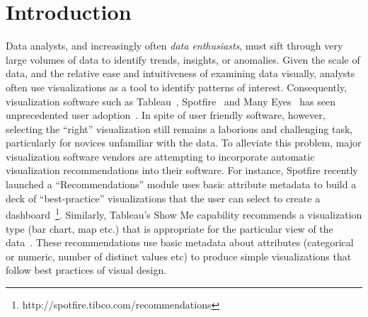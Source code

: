 
\section{Introduction}
\label{sec:introduction}


Data analysts, and increasingly often {\it data enthusiasts}, must sift through very large volumes of data 
to identify trends, insights, or anomalies. 
Given the scale of data, and the relative ease and intuitiveness of examining data visually,
analysts often use visualizations as a tool to identify patterns of interest.
Consequently, visualization software such as Tableau~\cite{}, Spotfire~\cite{} and Many Eyes~\cite{} 
has seen unprecedented user adoption~\cite{kristi-tech-report}.
In spite of user friendly software, however, selecting the ``right'' visualization still remains a laborious and 
challenging task, particularly for novices unfamiliar with the data. 
To alleviate this problem, major visualization software vendors are attempting to incorporate automatic visualization
recommendations into their software.
For instance, Spotfire recently launched a ``Recommendations'' module uses basic attribute metadata to build a deck of
``best-practice'' visualizations that the user can select to create a 
dashboard~\footnote{http://spotfire.tibco.com/recommendations}.
Similarly, Tableau's Show Me capability recommends a visualization type (bar chart, map etc.) that is appropriate
for the particular view of the data~\cite{DBLP:journals/tvcg/MackinlayHS07}.
These recommendations use basic metadata about attributes (categorical or numeric, number of distinct values etc)
to produce simple visualizations that follow best practices of visual design.


